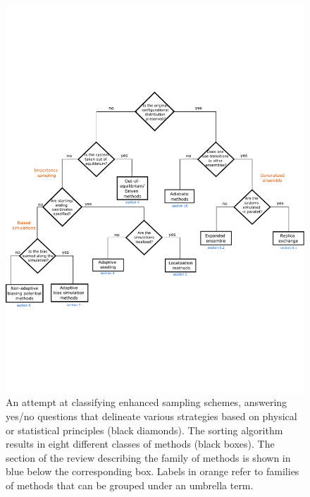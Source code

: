 \documentclass[9pt,review]{livecoms}
\begin{document}
\begin{figure}[!htb]
\includegraphics[scale=0.85]{Figures/Enhanced_sampling_sorting_final.pdf}
  \caption{An attempt at classifying enhanced sampling schemes, answering yes/no questions that delineate various strategies based on physical or statistical principles (black diamonds). The sorting algorithm results in eight different classes of methods (black boxes). The section of the review describing the family of methods is shown in blue below the corresponding box. Labels in orange refer to families of methods that can be grouped under an umbrella term.}
  \label{fig:scheme}
\end{figure}
\end{document}
